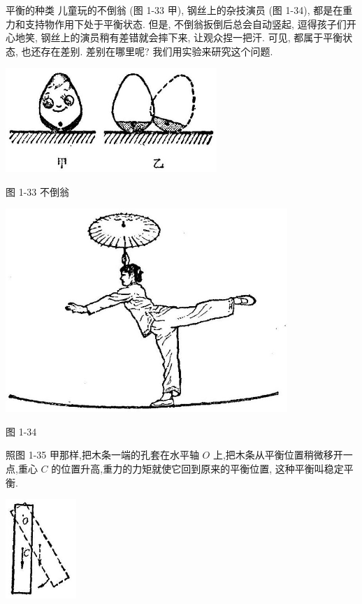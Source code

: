 \documentclass[10pt]{article}
\begin{document}
平衡的种类 儿童玩的不倒翁 (图 1-33 甲), 钢丝上的杂技演员 (图 1-34), 都是在重力和支持物作用下处于平衡状态. 但是, 不倒翁扳倒后总会自动竖起, 逗得孩子们开心地笑, 钢丝上的演员稍有差错就会摔下来, 让观众捏一把汗. 可见, 都属于平衡状态, 也还存在差别. 差别在哪里呢? 我们用实验来研究这个问题.

\begin{center}
\includegraphics[max width=0.6\textwidth]{images/01912d55-147c-70aa-b0e0-1782a122f948_46_603417.jpg}
\end{center}

图 1-33 不倒翁

\begin{center}
\includegraphics[max width=0.8\textwidth]{images/01912d55-147c-70aa-b0e0-1782a122f948_46_750520.jpg}
\end{center}

图 1-34

照图 1-35 甲那样,把木条一端的孔套在水平轴 \(O\) 上,把木条从平衡位置稍微移开一点,重心 \(C\) 的位置升高,重力的力矩就使它回到原来的平衡位置, 这种平衡叫稳定平衡.

\begin{center}
\includegraphics[max width=0.2\textwidth]{images/01912d55-147c-70aa-b0e0-1782a122f948_46_222690.jpg}
\end{center}
\end{document}
